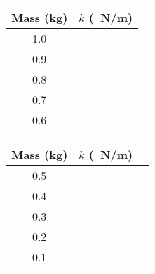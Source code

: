 \documentclass[]{exam}
\begin{document}
\begin{questions}
\begin{parts}
\begin{EnvUplevel}
\begin{center}
\bgroup
\def\arraystretch{1.5}
\begin{minipage}{5cm}
\centering
\begin{tabular}{|c|c|}
    \hline
    Mass (kg) & $k$ (\SI{}{N/m}) \\ \hline
    1.0 & \hspace{2cm}  \\ \hline
    0.9 & \\ \hline
    0.8 & \\ \hline
    0.7 & \\ \hline
    0.6 & \\ \hline
\end{tabular}
\end{minipage}%
\begin{minipage}{6cm}
\centering
\begin{tabular}{|c|c|c|}
    \hline
    Mass (kg) & $k$ (\SI{}{N/m}) \\ \hline
    0.5 & \hspace{2cm} \\ \hline
    0.4 & \\ \hline
    0.3 & \\ \hline
    0.2 & \\ \hline
    0.1 & \\ \hline
\end{tabular}
\end{minipage}
\egroup
\end{center}
\end{EnvUplevel}
\end{parts}

\end{questions}

\end{document}

